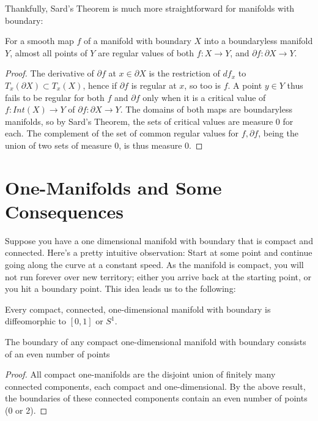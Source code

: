 Thankfully, Sard's Theorem is much more straightforward for manifolds with boundary: 

\begin{theorem}
    For a smooth map $f$ of a manifold with boundary $X$ into a boundaryless manifold $Y$, almost all points of $Y$ are regular values of both $f: X \to Y$, and $\partial f: \partial X \to Y$. 
\end{theorem}

\begin{proof}
    The derivative of $\partial f$ at $x \in \partial X$ is the restriction of $df_x$ to $T_x(\partial X) \subset T_x(X)$, hence if $\partial f$ is regular at $x$, so too is $f$. A point $y \in Y$ thus fails to be regular for both $f$ and $\partial f$ only when it is a critical value of $f: Int(X) \to Y$ of $\partial f: \partial X \to Y$. The domains of both maps are boundaryless manifolds, so by Sard's Theorem, the sets of critical values are measure 0 for each. The complement of the set of common regular values for $f, \partial f$, being the union of two sets of measure 0, is thus measure 0. 
\end{proof}

\section{One-Manifolds and Some Consequences}

Suppose you have a one dimensional manifold with boundary that is compact and connected. Here's a pretty intuitive observation: Start at some point and continue going along the curve at a constant speed. As the manifold is compact, you will not run forever over new territory; either you arrive back at the starting point, or you hit a boundary point. This idea leads us to the following:

\begin{theorem}
    Every compact, connected, one-dimensional manifold with boundary is diffeomorphic to $[0,1]$ or $S^1$. 
\end{theorem}

\begin{corollary}
    The boundary of any compact one-dimensional manifold with boundary consists of an even number of points
\end{corollary}

\begin{proof}
    All compact one-manifolds are the disjoint union of finitely many connected components, each compact and one-dimensional. By the above result, the boundaries of these connected components contain an even number of points (0 or 2).
\end{proof}

